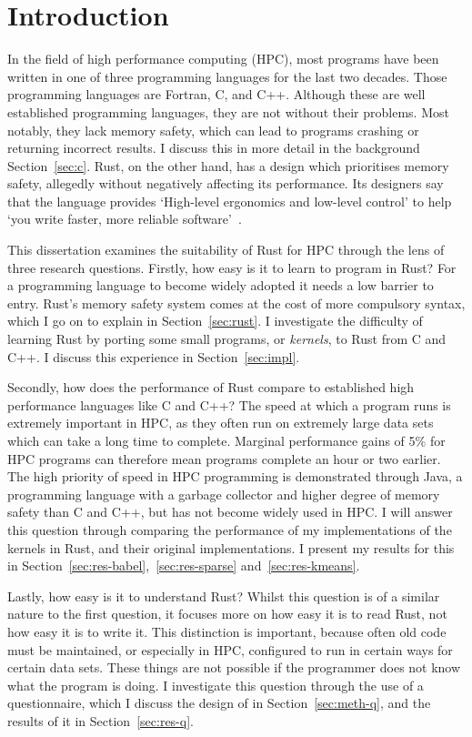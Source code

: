 \chapter{Introduction}
In the field of high performance computing (HPC), most programs have been written in one of three programming languages for the last two decades. Those programming languages are Fortran, C, and C++. Although these are well established programming languages, they are not without their problems. Most notably, they lack memory safety, which can lead to programs crashing or returning incorrect results. I discuss this in more detail in the background Section~\ref{sec:c}. Rust, on the other hand, has a design which prioritises memory safety, allegedly without negatively affecting its performance. 
Its designers say that the language provides `High-level ergonomics and low-level control' to help `you write faster, more reliable software'~\cite{RustBook}.

This dissertation examines the suitability of Rust for HPC through the lens of three research questions. Firstly, how easy is it to learn to program in Rust? For a programming language to become widely adopted it needs a low barrier to entry. Rust's memory safety system comes at the cost of more compulsory syntax, which I go on to explain in Section~\ref{sec:rust}. I investigate the difficulty of learning Rust by porting some small programs, or {\em kernels}, to Rust from C and C++. I discuss this experience in Section~\ref{sec:impl}.

Secondly, how does the performance of Rust compare to established high performance languages like C and C++?
The speed at which a program runs is extremely important in HPC, as they often run on extremely large data sets which can take a long time to complete. Marginal performance gains of 5\% for HPC programs can therefore mean programs complete an hour or two earlier.
The high priority of speed in HPC programming is demonstrated through Java, a programming language with a garbage collector and higher degree of memory safety than C and C++, but has not become widely used in HPC\@. I will answer this question through comparing the performance of my implementations of the kernels in Rust, and their original implementations. I present my results for this in Section~\ref{sec:res-babel},~\ref{sec:res-sparse} and~\ref{sec:res-kmeans}.

Lastly, how easy is it to understand Rust? Whilst this question is of a similar nature to the first question, it focuses more on how easy it is to read Rust, not how easy it is to write it. This distinction is important, because often old code must be maintained, or especially in HPC, configured to run in certain ways for certain data sets. These things are not possible if the programmer does not know what the program is doing. I investigate this question through the use of a questionnaire, which I discuss the design of in Section~\ref{sec:meth-q}, and the results of it in Section~\ref{sec:res-q}.
